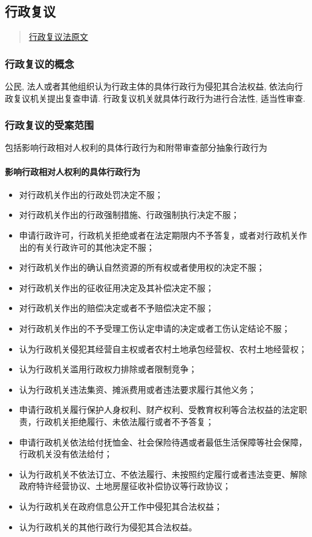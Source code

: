 \subsection{行政复议}

\begin{quote}
	\href{https://www.gov.cn/yaowen/liebiao/202309/content_6901584.htm}{行政复议法原文}
\end{quote}

\subsubsection{行政复议的概念} 公民, 法人或者其他组织认为行政主体的具体行政行为侵犯其合法权益, 依法向行政复议机关提出复查申请. 行政复议机关就具体行政行为进行合法性, 适当性审查.

\subsubsection{行政复议的受案范围} 包括影响行政相对人权利的具体行政行为和附带审查部分抽象行政行为

\paragraph{影响行政相对人权利的具体行政行为}

\begin{itemize}
	\item 对行政机关作出的行政处罚决定不服；
	\item 对行政机关作出的行政强制措施、行政强制执行决定不服；
	\item 申请行政许可，行政机关拒绝或者在法定期限内不予答复，或者对行政机关作出的有关行政许可的其他决定不服；
	\item 对行政机关作出的确认自然资源的所有权或者使用权的决定不服；
	\item 对行政机关作出的征收征用决定及其补偿决定不服；
	\item 对行政机关作出的赔偿决定或者不予赔偿决定不服；
	\item 对行政机关作出的不予受理工伤认定申请的决定或者工伤认定结论不服；
	\item 认为行政机关侵犯其经营自主权或者农村土地承包经营权、农村土地经营权；
	\item 认为行政机关滥用行政权力排除或者限制竞争；
	\item 认为行政机关违法集资、摊派费用或者违法要求履行其他义务；
	\item 申请行政机关履行保护人身权利、财产权利、受教育权利等合法权益的法定职责，行政机关拒绝履行、未依法履行或者不予答复；
	\item 申请行政机关依法给付抚恤金、社会保险待遇或者最低生活保障等社会保障，行政机关没有依法给付；
	\item 认为行政机关不依法订立、不依法履行、未按照约定履行或者违法变更、解除政府特许经营协议、土地房屋征收补偿协议等行政协议；
	\item 认为行政机关在政府信息公开工作中侵犯其合法权益；
	\item 认为行政机关的其他行政行为侵犯其合法权益。
\end{itemize}


